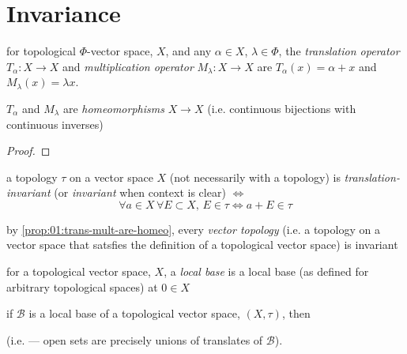 \section{Invariance}
\begin{defn}
  for topological $\Phi$-vector space, $X$, and any ${\alpha\in X}$,
  ${\lambda\in\Phi}$, the \emph{translation operator}
  ${T_\alpha:X\rightarrow X}$ and \emph{multiplication operator}
  ${M_\lambda: X\rightarrow X}$ are ${T_\alpha(x) = \alpha + x}$
  and ${M_\lambda(x)=\lambda x}$.
\end{defn}

\begin{prop}\label{prop:01:trans-mult-are-homeo}
  $T_\alpha$ and $M_\lambda$ are \emph{homeomorphisms} ${X\rightarrow X}$
  (i.e. continuous bijections with continuous inverses)
\end{prop}
\begin{proof}
\end{proof}

\begin{defn}
  a topology $\tau$ on a vector space $X$
  (not necessarily with a topology)
  is \emph{translation-invariant} (or \emph{invariant} when
  context is clear) $\iff$
  \[
  \forall a\in X\,\forall E\subset X,\,
  E\in\tau \Leftrightarrow a+E\in\tau
  \]
\end{defn}

\begin{rem}{}
  by \ref{prop:01:trans-mult-are-homeo}, every \emph{vector topology}
  (i.e. a topology on a vector space that satsfies the definition
  of a topological vector space) is invariant
\end{rem}

\begin{defn}
  for a topological vector space, $X$, a \emph{local base}
  is a local base (as defined for arbitrary topological spaces)
  at ${0\in X}$
\end{defn}

\begin{rem}{}
  if $\mathcal{B}$ is a local base of a topological vector space,
  ${(X,\tau)}$, then
  (i.e. --- open sets are precisely unions of translates of
  $\mathcal{B}$).
\end{rem}

